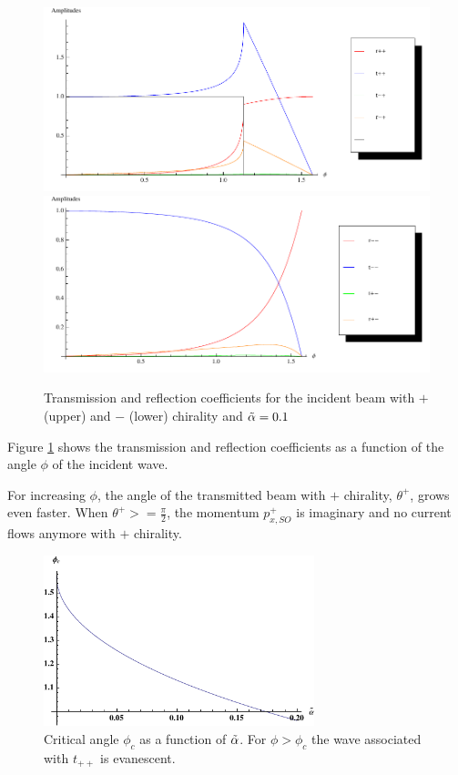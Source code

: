\begin{figure}[h!tp]
    \includegraphics[width=\textwidth]{zero-plus.pdf}
    \includegraphics[width=\textwidth]{zero-minus.pdf}
    \caption{Transmission and reflection coefficients for the
            incident beam with $+$ (upper) and $-$ (lower) chirality
            and $\tilde \alpha = 0.1$}
    \label{fig:trans-zero}
\end{figure}

Figure \ref{fig:trans-zero} shows the transmission and reflection
coefficients as a function of the angle $\phi$ of the incident wave.

For increasing $\phi$, the angle of the transmitted beam with $+$
chirality, $\theta^+$, grows even faster. When $\theta^+ >=
\frac{\pi}{2}$, the momentum $p_{x,SO}^+$ is imaginary and no current flows
anymore with $+$ chirality. 

\begin{figure}
    \begin{center}
        \includegraphics[width=0.7\textwidth]{critical-angle.pdf}
    \end{center}
    \caption{Critical angle $\phi_c$ as a function of $\tilde \alpha$. For $\phi
        > \phi_c$ the wave associated with $t_{++}$ is evanescent.}
    \label{fig:critical-angle}
\end{figure}

